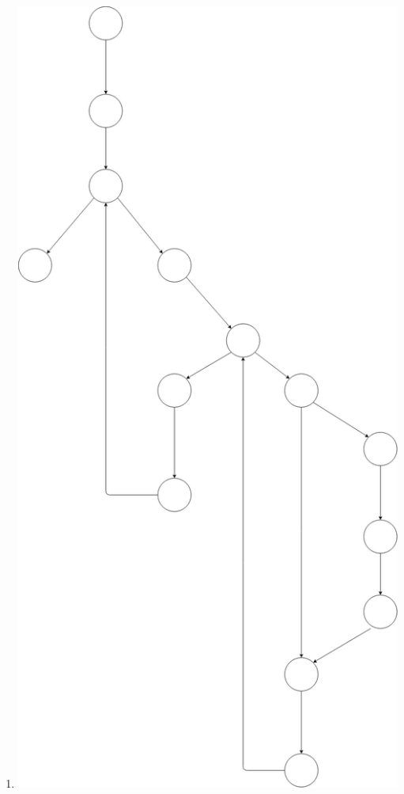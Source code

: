 \documentclass[12pt]{article}
\begin{document}
\begin{enumerate}
	\item \includegraphics[scale=0.25]{./BubbleSortCFG.png}
\end{enumerate}
\end{document}
